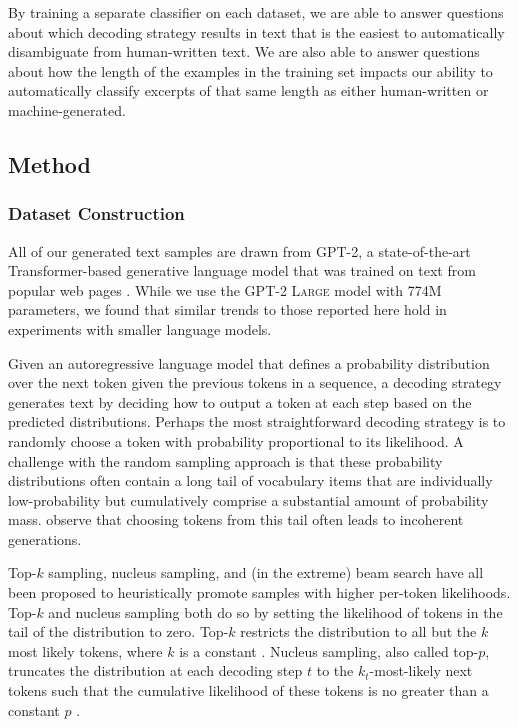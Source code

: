 By training a separate classifier on each dataset, we are able to answer questions about which decoding strategy results in text that is the easiest to automatically disambiguate from human-written text.
We are also able to answer questions about how the length of the examples in the training set impacts our ability to automatically classify excerpts of that same length as either human-written or machine-generated.

\subsection{Method}
\subsubsection{Dataset Construction}
All of our generated text samples are drawn from GPT-2, a state-of-the-art Transformer-based generative language model that was trained on text from popular web pages \citep{radford2019language}.
While we use the GPT-2 \textsc{Large} model with 774M parameters, we found that similar trends to those reported here hold in experiments with smaller language models.

Given an autoregressive language model that defines a probability distribution over the next token given the previous tokens in a sequence, a decoding strategy generates text by deciding how to output a token at each step based on the predicted distributions.
Perhaps the most straightforward decoding strategy is to randomly choose a token with probability proportional to its likelihood.
A challenge with the random sampling approach is that these probability distributions  often contain a long tail of vocabulary items that are individually low-probability but cumulatively comprise a substantial amount of probability mass.
\citet{holtzman2019curious} observe that choosing tokens from this tail often leads to incoherent generations.

Top-$k$ sampling, nucleus sampling, and (in the extreme) beam search have all been proposed to heuristically promote samples with higher per-token likelihoods.
Top-$k$ and nucleus sampling both do so by setting the likelihood of tokens in the tail of the distribution to zero.
Top-$k$ restricts the distribution to all but the $k$ most likely tokens, where $k$ is a constant \citep{fan2018hierarchical}.
Nucleus sampling, also called top-$p$, truncates the distribution at each decoding step $t$ to the $k_t$-most-likely next tokens such that the cumulative likelihood of these tokens is no greater than a constant $p$ \citep{holtzman2019curious}.

